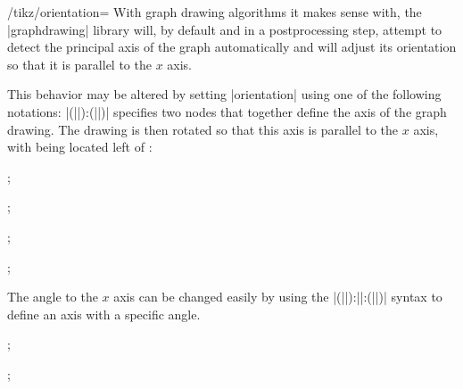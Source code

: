 \begin{key}{/tikz/orientation=}
  With graph drawing algorithms it makes sense with, the |graphdrawing|
  library will, by default and in a postprocessing step, attempt to
  detect the principal axis of the graph automatically and will adjust
  its orientation so that it is parallel to the $x$ axis.

  This behavior may be altered by setting |orientation| using one of
  the following notations:
  |(||):(||)| specifies
  two nodes that together define the axis of the graph drawing. The
  drawing is then rotated so that this axis is parallel to the $x$
  axis, with  being located left of :
  \begin{codeexample}[]
\tikz {};
  \end{codeexample}
  \begin{codeexample}[]
\tikz {};
  \end{codeexample}
  \begin{codeexample}[]
\tikz {};
  \end{codeexample}
  \begin{codeexample}[]
\tikz {};
  \end{codeexample}
  The angle to the $x$ axis can be changed easily by using the
  |(||):||:(||)|
  syntax to define an axis with a specific angle.
  \begin{codeexample}[]
\tikz {};
  \end{codeexample}
  \begin{codeexample}[]
\tikz {};
  \end{codeexample}
\end{key}

